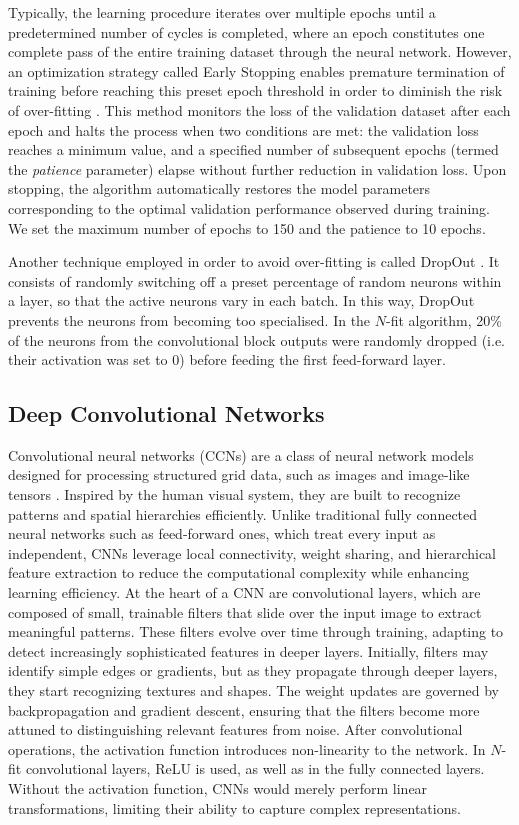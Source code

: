 Typically, the learning procedure iterates over multiple epochs until a predetermined number of cycles is completed, where an epoch constitutes one complete pass of the entire training dataset through the neural network. However, an optimization strategy called Early Stopping enables premature termination of training before reaching this preset epoch threshold in order to diminish the risk of over-fitting \cite{EarlyStop}. This method monitors the loss of the validation dataset after each epoch and halts the process when two conditions are met: the validation loss reaches a minimum value, and a specified number of subsequent epochs (termed the \textit{patience} parameter) elapse without further reduction in validation loss. Upon stopping, the algorithm automatically restores the model parameters corresponding to the optimal validation performance observed during training. We set the maximum number of epochs to 150 and the patience to 10 epochs.

Another technique employed in order to avoid over-fitting is called DropOut \cite{Dropout}. It consists of randomly switching off a preset percentage of random neurons within a layer, so that the active neurons vary in each batch. In this way, DropOut prevents the neurons from becoming too specialised. In the $N$-fit algorithm, 20\% of the neurons from the convolutional block outputs were randomly dropped (i.e. their activation was set to 0) before feeding the first feed-forward layer.


\subsection{Deep Convolutional Networks}
\label{subsec:DCN}

Convolutional neural networks (CCNs) are a class of neural network models designed for processing structured grid data, such as images and image-like tensors \cite{CNN}. Inspired by the human visual system, they are built to recognize patterns and spatial hierarchies efficiently. Unlike traditional fully connected neural networks such as feed-forward ones, which treat every input as independent, CNNs leverage local connectivity, weight sharing, and hierarchical feature extraction to reduce the computational complexity while enhancing learning efficiency. At the heart of a CNN are convolutional layers, which are composed of small, trainable filters that slide over the input image to extract meaningful patterns.  These filters evolve over time through training, adapting to detect increasingly sophisticated features in deeper layers. Initially, filters may identify simple edges or gradients, but as they propagate through deeper layers, they start recognizing textures and shapes. The weight updates are governed by backpropagation and gradient descent, ensuring that the filters become more attuned to distinguishing relevant features from noise. After convolutional operations, the activation function introduces non-linearity to the network. In $N$-fit convolutional layers, ReLU is used, as well as in the fully connected layers. Without the activation function, CNNs would merely perform linear transformations, limiting their ability to capture complex representations.

